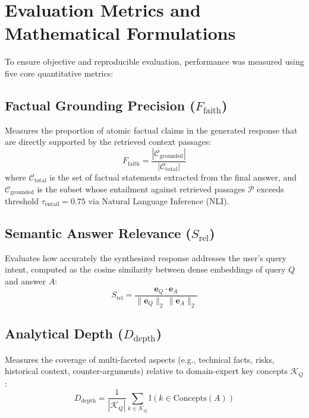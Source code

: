 \section{Evaluation Metrics and Mathematical Formulations}
\label{sec:eval_metrics}

To ensure objective and reproducible evaluation, performance was measured using five core quantitative metrics:

\subsection{Factual Grounding Precision ($F_{\text{faith}}$)}
Measures the proportion of atomic factual claims in the generated response that are directly supported by the retrieved context passages:
\begin{equation}
\label{eq:faithfulness}
F_{\text{faith}} = \frac{|\mathcal{C}_{\text{grounded}}|}{|\mathcal{C}_{\text{total}}|}
\end{equation}
where $\mathcal{C}_{\text{total}}$ is the set of factual statements extracted from the final answer, and $\mathcal{C}_{\text{grounded}}$ is the subset whose entailment against retrieved passages $\mathcal{P}$ exceeds threshold $\tau_{\text{entail}} = 0.75$ via Natural Language Inference (NLI).

\subsection{Semantic Answer Relevance ($S_{\text{rel}}$)}
Evaluates how accurately the synthesized response addresses the user's query intent, computed as the cosine similarity between dense embeddings of query $Q$ and answer $A$:
\begin{equation}
\label{eq:relevance}
S_{\text{rel}} = \frac{\mathbf{e}_Q \cdot \mathbf{e}_A}{\|\mathbf{e}_Q\|_2 \, \|\mathbf{e}_A\|_2}
\end{equation}

\subsection{Analytical Depth ($D_{\text{depth}}$)}
Measures the coverage of multi-faceted aspects (e.g., technical facts, risks, historical context, counter-arguments) relative to domain-expert key concepts $\mathcal{K}_Q$:
\begin{equation}
\label{eq:depth}
D_{\text{depth}} = \frac{1}{|\mathcal{K}_Q|} \sum_{k \in \mathcal{K}_Q} \mathbb{I}\left(k \in \text{Concepts}(A)\right)
\end{equation}

